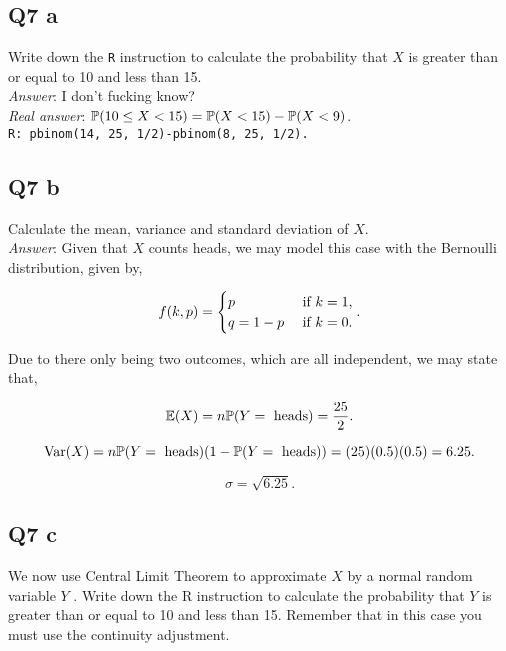 \documentclass{article}
\begin{document}
        \subsection{Q7 a}
            Write down the \verb|R| instruction to calculate the probability that $X$ is greater than or equal to 10 and less than 15.\\

            \textit{Answer}: I don't fucking know?\\

            \textit{Real answer}: $\mathbb{P}( 10 \leq X < 15) = \mathbb{P}(X < 15) - \mathbb{P}(X < 9)$.\\

            \verb|R: pbinom(14, 25, 1/2)-pbinom(8, 25, 1/2).|

        \subsection{Q7 b}
            Calculate the mean, variance and standard deviation of $X$.\\

            \textit{Answer}: Given that $X$ counts heads, we may model this case with the Bernoulli distribution, given by,

            \[f(k, p) = \begin{cases}
                p&\text{ if } k = 1,\\
                q = 1- p&\text{ if } k = 0.
            \end{cases}.\]

            Due to there only being two outcomes, which are all independent, we may state that,

            \[\mathbb{E}(X) = n\mathbb{P}(Y = \text{ heads}) = \frac{25}{2}.\]

            \[\text{Var}(X) = n\mathbb{P}(Y = \text{ heads})(1-\mathbb{P}(Y = \text{ heads})) = (25)(0.5)(0.5)=6.25.\]

            \[\sigma = \sqrt{6.25}.\]

        \subsection{Q7 c}
            We now use Central Limit Theorem to approximate $X$ by a normal random variable $Y$ . Write down the R instruction to calculate the probability that $Y$ is greater than or equal to 10 and less than 15. Remember that in this case you must use the continuity adjustment.\\
\end{document}
